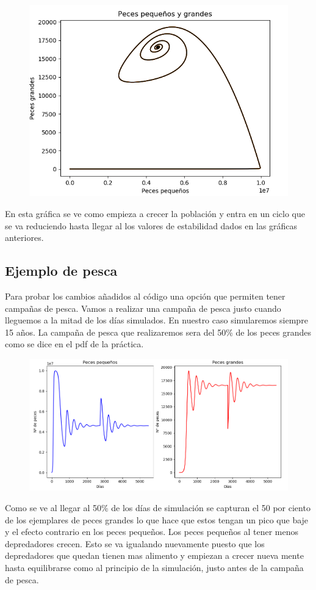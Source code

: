 \documentclass[]{article}
\begin{document}
\begin{figure}[H]
	\centering
	\includegraphics[width=0.7\linewidth]{img/screenshot0021}
	\label{fig:screenshot0021}
\end{figure}

En esta gráfica se ve como empieza a crecer la población y entra en un ciclo que se va reduciendo hasta llegar al los valores de estabilidad dados en las gráficas anteriores.

\subsection{Ejemplo de pesca}
Para probar los cambios añadidos al código una opción que permiten tener campañas de pesca. Vamos a realizar una campaña de pesca justo cuando lleguemos a la mitad de los días simulados. En nuestro caso simularemos siempre 15 años. La campaña de pesca que realizaremos sera del 50\% de los peces grandes como se dice en el pdf de la práctica.

\begin{figure}[H]
	\centering
	\includegraphics[width=1\linewidth]{img/screenshot0030}
	\caption{}
	\label{fig:screenshot0030}
\end{figure}
Como se ve al llegar al 50\% de los días de simulación se capturan el 50 por ciento de los ejemplares de peces grandes lo que hace que estos tengan un pico que baje y el efecto contrario en los peces pequeños. Los peces pequeños al tener menos depredadores crecen. Esto se va igualando nuevamente puesto que los depredadores que quedan tienen mas alimento y empiezan a crecer nueva mente hasta equilibrarse como al principio de la simulación, justo antes de la campaña de pesca. 
\end{document}
